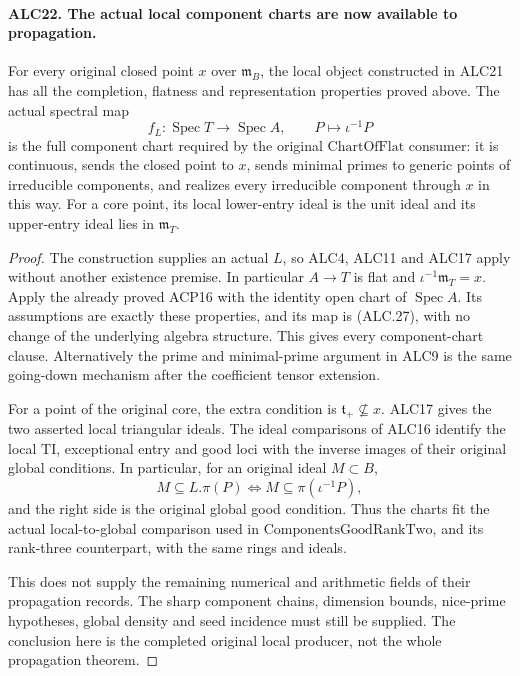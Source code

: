 \documentclass[11pt,a4paper]{article}
\numberwithin{equation}{section}
\theoremstyle{remark}\newtheorem{remark}[theorem]{Remark}
\begin{document}
\paragraph{ALC22. The actual local component charts are now available to propagation.}
\label{claim:ALC22}
For every original closed point \(x\) over
\(\mathfrak m_B\), the local object constructed in ALC21
has all the completion, flatness and representation properties
proved above.  The actual spectral map
\[
       f_L:\operatorname{Spec}T\longrightarrow\operatorname{Spec}A,
                     \qquad P\longmapsto\iota^{-1}P
                                                        \tag{ALC.27}
\]
is the full component chart required by the original
\(\mathrm{ChartOfFlat}\) consumer: it is continuous,
sends the closed point to \(x\), sends minimal primes to
generic points of irreducible components, and realizes every
irreducible component through \(x\) in this way.  For a
core point, its local lower-entry ideal is the unit ideal
and its upper-entry ideal lies in \(\mathfrak m_T\).

\begin{proof}
The construction supplies an actual \(L\), so ALC4,
ALC11 and ALC17 apply without another existence premise.
In particular \(A\to T\) is flat and
\(\iota^{-1}\mathfrak m_T=x\).  Apply the already
proved ACP16 with the identity open chart of
\(\operatorname{Spec}A\).  Its assumptions are exactly
these properties, and its map is (ALC.27), with no change
of the underlying algebra structure.  This gives every
component-chart clause.  Alternatively the prime and
minimal-prime argument in ALC9 is the same going-down
mechanism after the coefficient tensor extension.

For a point of the original core, the extra condition is
\(\mathfrak t_+\not\subseteq x\).  ALC17 gives the
two asserted local triangular ideals.  The ideal comparisons
of ALC16 identify the local \(\mathrm{TI}\), exceptional
entry and good loci with the inverse images of their
original global conditions.  In particular, for an original
ideal \(M\subset B\),
\[
          M\subseteq L.\pi(P)
             \Longleftrightarrow
          M\subseteq\pi(\iota^{-1}P),
                                                        \tag{ALC.28}
\]
and the right side is the original global good condition.
Thus the charts fit the actual local-to-global comparison
used in \(\mathrm{ComponentsGoodRankTwo}\), and its
rank-three counterpart, with the same rings and ideals.

This does not supply the remaining numerical and arithmetic
fields of their propagation records.  The sharp component
chains, dimension bounds, nice-prime hypotheses, global
density and seed incidence must still be supplied.  The
conclusion here is the completed original local producer,
not the whole propagation theorem.
\end{proof}
\end{document}
